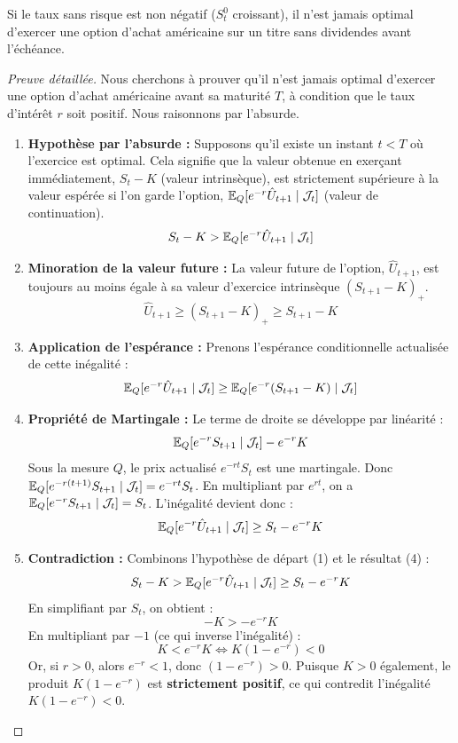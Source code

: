 \begin{proposition}
Si le taux sans risque est non négatif ($S_t^0$ croissant), il n'est jamais optimal d'exercer une option d'achat américaine sur un titre sans dividendes avant l'échéance.
\end{proposition}

\begin{proof}[Preuve détaillée]
Nous cherchons à prouver qu'il n'est jamais optimal d'exercer une option d'achat américaine avant sa maturité $T$, à condition que le taux d'intérêt $r$ soit positif. Nous raisonnons par l'absurde.

\begin{enumerate}
    \item \textbf{Hypothèse par l'absurde :} Supposons qu'il existe un instant $t < T$ où l'exercice est optimal. Cela signifie que la valeur obtenue en exerçant immédiatement, $S_t - K$ (valeur intrinsèque), est strictement supérieure à la valeur espérée si l'on garde l'option, $\mathbb{E}_Q[e^{-r} \hat{U}_{t+1} \mid \mathcal{J}_t]$ (valeur de continuation).
    \[
    S_t - K > \mathbb{E}_Q[e^{-r} \hat{U}_{t+1} \mid \mathcal{J}_t]
    \]
    
    \item \textbf{Minoration de la valeur future :} La valeur future de l'option, $\hat{U}_{t+1}$, est toujours au moins égale à sa valeur d'exercice intrinsèque $(S_{t+1} - K)_+$.
    \[
    \hat{U}_{t+1} \ge (S_{t+1} - K)_+ \ge S_{t+1} - K
    \]
    
    \item \textbf{Application de l'espérance :} Prenons l'espérance conditionnelle actualisée de cette inégalité :
    \[
    \mathbb{E}_Q[e^{-r} \hat{U}_{t+1} \mid \mathcal{J}_t] \ge \mathbb{E}_Q[e^{-r} (S_{t+1} - K) \mid \mathcal{J}_t]
    \]
    
    \item \textbf{Propriété de Martingale :} Le terme de droite se développe par linéarité :
    \[
    \mathbb{E}_Q[e^{-r} S_{t+1} \mid \mathcal{J}_t] - e^{-r} K
    \]
    Sous la mesure $Q$, le prix actualisé $e^{-rt} S_t$ est une martingale. Donc $\mathbb{E}_Q[e^{-r(t+1)}S_{t+1} \mid \mathcal{J}_t] = e^{-rt}S_t$. En multipliant par $e^{rt}$, on a $\mathbb{E}_Q[e^{-r} S_{t+1} \mid \mathcal{J}_t] = S_t$.
    L'inégalité devient donc :
    \[
    \mathbb{E}_Q[e^{-r} \hat{U}_{t+1} \mid \mathcal{J}_t] \ge S_t - e^{-r} K
    \]
    
    \item \textbf{Contradiction :} Combinons l'hypothèse de départ (1) et le résultat (4) :
    \[
    S_t - K > \mathbb{E}_Q[e^{-r} \hat{U}_{t+1} \mid \mathcal{J}_t] \ge S_t - e^{-r} K
    \]
    En simplifiant par $S_t$, on obtient :
    \[
    -K > -e^{-r} K
    \]
    En multipliant par $-1$ (ce qui inverse l'inégalité) :
    \[
    K < e^{-r} K \iff K(1 - e^{-r}) < 0
    \]
    Or, si $r > 0$, alors $e^{-r} < 1$, donc $(1 - e^{-r}) > 0$. Puisque $K > 0$ également, le produit $K(1 - e^{-r})$ est \textbf{strictement positif}, ce qui contredit l'inégalité $K(1 - e^{-r}) < 0$.
    

\end{enumerate}
\end{proof}
